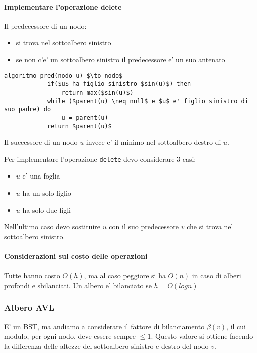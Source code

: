     \paragraph{Implementare l'operazione delete}
    Il predecessore di un nodo:
    \begin{itemize}
        \item si trova nel sottoalbero sinistro
        \item se non c'e' un sottoalbero sinistro il predecessore e' un suo antenato
    \end{itemize}

    \begin{lstlisting}[mathescape=true]
        algoritmo pred(nodo u) $\to nodo$
            if($u$ ha figlio sinistro $sin(u)$) then
                return max($sin(u)$)
            while ($parent(u) \neq null$ e $u$ e' figlio sinistro di suo padre) do
                u = parent(u)
            return $parent(u)$
    \end{lstlisting}

    Il successore di un nodo $u$ invece e' il minimo nel sottoalbero destro di $u$.

    Per implementare l'operazione \texttt{delete} devo considerare 3 casi:
    \begin{itemize}
        \item $u$ e' una foglia
        \item $u$ ha un solo figlio
        \item $u$ ha solo due figli
    \end{itemize}

    Nell'ultimo caso devo sostituire $u$ con il suo predecessore $v$ che si trova nel sottoalbero sinistro.

    \paragraph{Considerazioni sul costo delle operazioni}
    Tutte hanno costo $O(h)$, ma al caso peggiore si ha $O(n)$ in caso di
    alberi profondi e sbilanciati.
    Un albero e' bilanciato se $h=O(log n)$

\subsubsection{Albero AVL}
    E' un BST, ma andiamo a considerare il fattore di bilanciamento $\beta(v)$, il cui modulo,  per ogni nodo, deve essere sempre $\leq 1$. 
    Questo valore si ottiene facendo la differenza delle altezze del sottoalbero sinistro e destro del nodo $v$.

